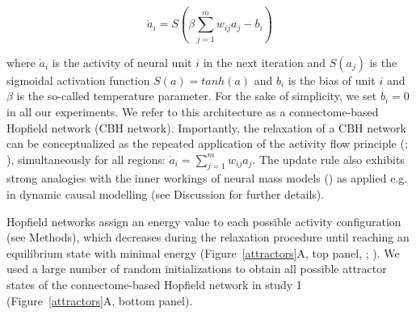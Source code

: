 \documentclass{article}
\begin{document}
\begin{equation}
\label{hopfield-update}
\dot{a}_i = S(\beta \sum_{j=1}^m w_{ij}a_j - b_i)
\end{equation}

where $\dot{a}_i$ is the activity of neural unit $i$ in the next iteration and $S(a_j)$ is the sigmoidal activation function $S(a) = tanh(a)$ and $b_i$ is the bias of unit $i$ and $\beta$ is the so-called temperature parameter. For the sake of simplicity, we set $b_i=0$ in all our experiments. We refer to this architecture as a connectome-based Hopfield network (CBH network).
Importantly, the relaxation of a CBH network can be conceptualized as the repeated application of the activity flow principle (\href{https://doi.org/10.1038/nn.4406}{}; \href{https://doi.org/10.1038/s41467-017-01000-w}{}), simultaneously for all regions: $\dot{a}_i = \sum_{j=1}^m w_{ij}a_j$.
The update rule also exhibits strong analogies with the inner workings of neural mass models  (\href{https://doi.org/10.1038/nn.4497}{}) as applied e.g. in dynamic causal modelling (see Discussion for further details).

Hopfield networks assign an energy value to each possible activity configuration (see Methods), which decreases during the relaxation procedure until reaching an equilibrium state with minimal energy (Figure~\ref{attractors}A, top panel, \href{https://doi.org/10.1073/pnas.79.8.2554}{}; \href{https://doi.org/10.1162/neco.1994.6.3.459}{}).
We used a large number of random initializations to obtain all possible attractor states of the connectome-based Hopfield network in study 1 (Figure~\ref{attractors}A, bottom panel).
\end{document}
